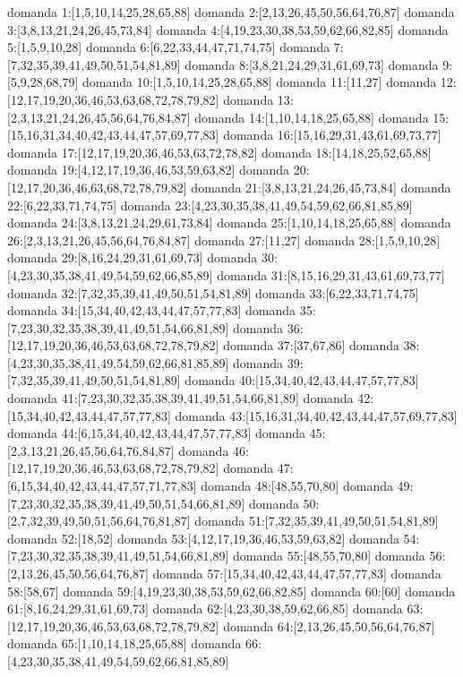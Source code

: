 domanda 1:[1,5,10,14,25,28,65,88]
domanda 2:[2,13,26,45,50,56,64,76,87]
domanda 3:[3,8,13,21,24,26,45,73,84]
domanda 4:[4,19,23,30,38,53,59,62,66,82,85]
domanda 5:[1,5,9,10,28]
domanda 6:[6,22,33,44,47,71,74,75]
domanda 7:[7,32,35,39,41,49,50,51,54,81,89]
domanda 8:[3,8,21,24,29,31,61,69,73]
domanda 9:[5,9,28,68,79]
domanda 10:[1,5,10,14,25,28,65,88]
domanda 11:[11,27]
domanda 12:[12,17,19,20,36,46,53,63,68,72,78,79,82]
domanda 13:[2,3,13,21,24,26,45,56,64,76,84,87]
domanda 14:[1,10,14,18,25,65,88]
domanda 15:[15,16,31,34,40,42,43,44,47,57,69,77,83]
domanda 16:[15,16,29,31,43,61,69,73,77]
domanda 17:[12,17,19,20,36,46,53,63,72,78,82]
domanda 18:[14,18,25,52,65,88]
domanda 19:[4,12,17,19,36,46,53,59,63,82]
domanda 20:[12,17,20,36,46,63,68,72,78,79,82]
domanda 21:[3,8,13,21,24,26,45,73,84]
domanda 22:[6,22,33,71,74,75]
domanda 23:[4,23,30,35,38,41,49,54,59,62,66,81,85,89]
domanda 24:[3,8,13,21,24,29,61,73,84]
domanda 25:[1,10,14,18,25,65,88]
domanda 26:[2,3,13,21,26,45,56,64,76,84,87]
domanda 27:[11,27]
domanda 28:[1,5,9,10,28]
domanda 29:[8,16,24,29,31,61,69,73]
domanda 30:[4,23,30,35,38,41,49,54,59,62,66,85,89]
domanda 31:[8,15,16,29,31,43,61,69,73,77]
domanda 32:[7,32,35,39,41,49,50,51,54,81,89]
domanda 33:[6,22,33,71,74,75]
domanda 34:[15,34,40,42,43,44,47,57,77,83]
domanda 35:[7,23,30,32,35,38,39,41,49,51,54,66,81,89]
domanda 36:[12,17,19,20,36,46,53,63,68,72,78,79,82]
domanda 37:[37,67,86]
domanda 38:[4,23,30,35,38,41,49,54,59,62,66,81,85,89]
domanda 39:[7,32,35,39,41,49,50,51,54,81,89]
domanda 40:[15,34,40,42,43,44,47,57,77,83]
domanda 41:[7,23,30,32,35,38,39,41,49,51,54,66,81,89]
domanda 42:[15,34,40,42,43,44,47,57,77,83]
domanda 43:[15,16,31,34,40,42,43,44,47,57,69,77,83]
domanda 44:[6,15,34,40,42,43,44,47,57,77,83]
domanda 45:[2,3,13,21,26,45,56,64,76,84,87]
domanda 46:[12,17,19,20,36,46,53,63,68,72,78,79,82]
domanda 47:[6,15,34,40,42,43,44,47,57,71,77,83]
domanda 48:[48,55,70,80]
domanda 49:[7,23,30,32,35,38,39,41,49,50,51,54,66,81,89]
domanda 50:[2,7,32,39,49,50,51,56,64,76,81,87]
domanda 51:[7,32,35,39,41,49,50,51,54,81,89]
domanda 52:[18,52]
domanda 53:[4,12,17,19,36,46,53,59,63,82]
domanda 54:[7,23,30,32,35,38,39,41,49,51,54,66,81,89]
domanda 55:[48,55,70,80]
domanda 56:[2,13,26,45,50,56,64,76,87]
domanda 57:[15,34,40,42,43,44,47,57,77,83]
domanda 58:[58,67]
domanda 59:[4,19,23,30,38,53,59,62,66,82,85]
domanda 60:[60]
domanda 61:[8,16,24,29,31,61,69,73]
domanda 62:[4,23,30,38,59,62,66,85]
domanda 63:[12,17,19,20,36,46,53,63,68,72,78,79,82]
domanda 64:[2,13,26,45,50,56,64,76,87]
domanda 65:[1,10,14,18,25,65,88]
domanda 66:[4,23,30,35,38,41,49,54,59,62,66,81,85,89]

